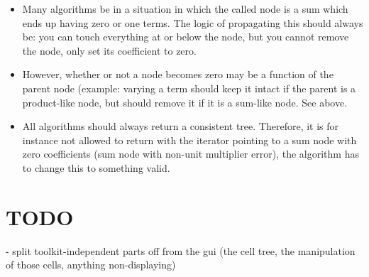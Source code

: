 \documentclass[11pt]{article}
\begin{document}
\begin{itemize}
\item Many algorithms be in a situation in which the called
  node is a sum which ends up having zero or one terms. The logic of
  propagating this should always be: you can touch everything at or
  below the node, but you cannot remove the node, only set its
  coefficient to zero. 

\item However, whether or not a node becomes zero may be a function of
  the parent node (example: varying a term should keep it intact if
  the parent is a product-like node, but should remove it if it is a
  sum-like node. See above.

\item All algorithms should always return a consistent
  tree. Therefore, it is for instance not allowed to return with the
  iterator pointing to a sum node with zero coefficients (sum node
  with non-unit multiplier error), the algorithm has to change this to
  something valid.

\end{itemize}


\section{TODO}

- split toolkit-independent parts off from the gui (the cell tree,
  the manipulation of those cells, anything non-displaying)


% 
% 
% 
% 
\end{document}
